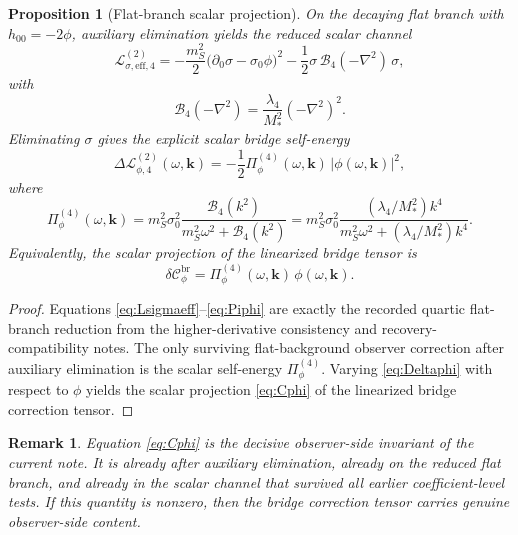 \documentclass[11pt]{article}
\newtheorem{proposition}{Proposition}
\newtheorem{remark}{Remark}
\begin{document}
\begin{proposition}[Flat-branch scalar projection]
\label{prop:scalarproj}
On the decaying flat branch with \(h_{00}=-2\phi\), auxiliary elimination yields the reduced scalar channel
\begin{equation}
\mathcal L_{\sigma,\mathrm{eff},4}^{(2)}
=
-\frac{m_S^2}{2}\bigl(\partial_0\sigma-\sigma_0\phi\bigr)^2
-\frac{1}{2}\sigma\,\mathcal B_4(-\nabla^2)\,\sigma,
\label{eq:Lsigmaeff}
\end{equation}
with
\begin{equation}
\mathcal B_4(-\nabla^2)
=
\frac{\lambda_4}{M_*^2}(-\nabla^2)^2.
\label{eq:B4op}
\end{equation}
Eliminating \(\sigma\) gives the explicit scalar bridge self-energy
\begin{equation}
\Delta\mathcal L_{\phi,4}^{(2)}(\omega,\mathbf{k})
=
-\frac{1}{2}\Pi_\phi^{(4)}(\omega,\mathbf{k})\,|\phi(\omega,\mathbf{k})|^2,
\label{eq:Deltaphi}
\end{equation}
where
\begin{equation}
\Pi_\phi^{(4)}(\omega,\mathbf{k})
=
m_S^2\sigma_0^2
\frac{\mathcal B_4(k^2)}
{m_S^2\omega^2+\mathcal B_4(k^2)}
=
m_S^2\sigma_0^2
\frac{(\lambda_4/M_*^2)k^4}
{m_S^2\omega^2+(\lambda_4/M_*^2)k^4}.
\label{eq:Piphi}
\end{equation}
Equivalently, the scalar projection of the linearized bridge tensor is
\begin{equation}
\delta\mathcal C_{\phi}^{\mathrm{br}}
=
\Pi_\phi^{(4)}(\omega,\mathbf{k})\,\phi(\omega,\mathbf{k}).
\label{eq:Cphi}
\end{equation}
\end{proposition}

\begin{proof}
Equations \eqref{eq:Lsigmaeff}--\eqref{eq:Piphi} are exactly the recorded quartic flat-branch reduction from the higher-derivative consistency and recovery-compatibility notes. The only surviving flat-background observer correction after auxiliary elimination is the scalar self-energy \(\Pi_\phi^{(4)}\). Varying \eqref{eq:Deltaphi} with respect to \(\phi\) yields the scalar projection \eqref{eq:Cphi} of the linearized bridge correction tensor.
\end{proof}

\begin{remark}
Equation \eqref{eq:Cphi} is the decisive observer-side invariant of the current note. It is already after auxiliary elimination, already on the reduced flat branch, and already in the scalar channel that survived all earlier coefficient-level tests. If this quantity is nonzero, then the bridge correction tensor carries genuine observer-side content.
\end{remark}
\end{document}
